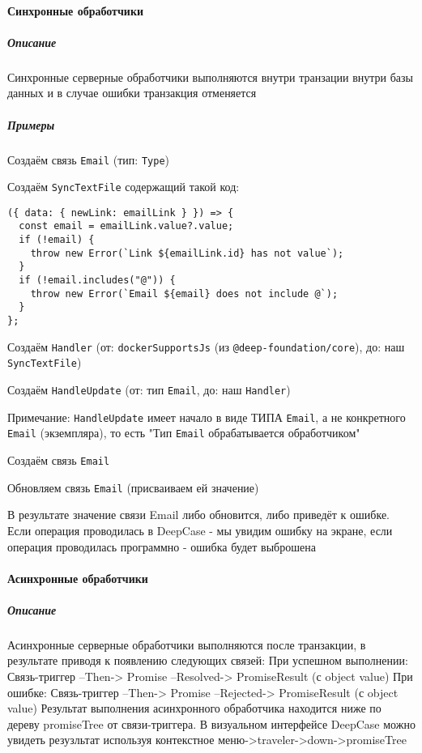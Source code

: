 \documentclass{article}
\begin{document}
\paragraph{Синхронные обработчики}
\subparagraph{Описание}

Синхронные серверные обработчики выполняются внутри транзации внутри базы данных и в случае ошибки
транзакция отменяется
\subparagraph{Примеры}

Создаём связь \texttt{Email} (тип: \texttt{Type})

Создаём \texttt{SyncTextFile} содержащий такой код:

\begin{lstlisting}
({ data: { newLink: emailLink } }) => {
  const email = emailLink.value?.value;
  if (!email) {
    throw new Error(`Link ${emailLink.id} has not value`);
  }
  if (!email.includes("@")) {
    throw new Error(`Email ${email} does not include @`);
  }
};
\end{lstlisting}

Создаём \texttt{Handler} (от: \texttt{dockerSupportsJs} (из
\texttt{@deep-foundation/core}), до: наш \texttt{SyncTextFile})

Создаём \texttt{HandleUpdate} (от: тип \texttt{Email}, до: наш
\texttt{Handler})

Примечание: \texttt{HandleUpdate} имеет начало в виде ТИПА \texttt{Email}, а
не конкретного \texttt{Email} (экземпляра), то есть "Тип \texttt{Email}
обрабатывается обработчиком"

Создаём связь \texttt{Email}

Обновляем связь \texttt{Email} (присваиваем ей значение)

В результате значение связи Email либо обновится, либо приведёт к ошибке.
Если операция проводилась в DeepCase - мы увидим ошибку на экране, если
операция проводилась программно - ошибка будет выброшена

\paragraph{Асинхронные обработчики}
\subparagraph{Описание}
Асинхронные серверные обработчики выполняются после транзакции, в результате
приводя к появлению следующих связей:
При успешном выполнении: Связь-триггер --Then-> Promise --Resolved->
PromiseResult (с object value)
При ошибке: Связь-триггер --Then-> Promise --Rejected-> PromiseResult (с object
value)
Результат выполнения асинхронного обработчика находится ниже по дереву promiseTree от связи-триггера. В визуальном интерфейсе DeepCase можно увидеть резузльтат используя контекстное меню->traveler->down->promiseTree
\end{document}
